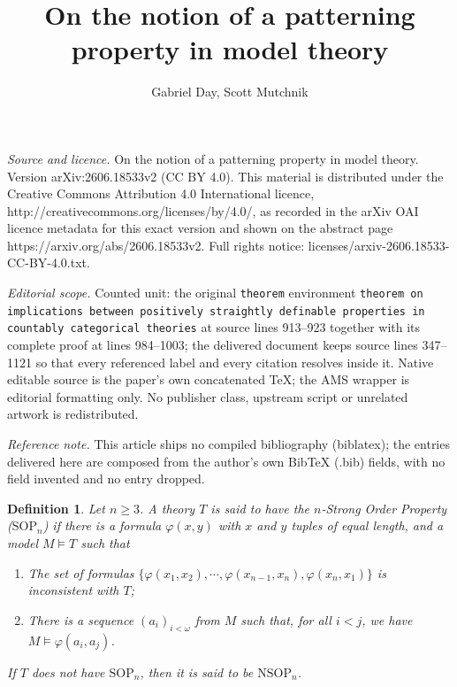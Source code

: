 \documentclass[10pt,a4paper]{amsart}
\newcommand{\NSOP}{\text{NSOP}}
\newcommand{\SOP}{\text{SOP}}
\newcommand{\SOPn}{$\text{SOP}_n$}
\newcommand{\vphi}{\varphi}
\newtheorem{definition}{Definition}
\begin{document}
\title[On the notion of a patterning property in model theory]{On the notion of a patterning property in model theory}
\author{Gabriel Day, Scott Mutchnik}
\date{}
\maketitle
\noindent\emph{Source and licence.} On the notion of a patterning property in model theory. Version arXiv:2606.18533v2 (CC BY 4.0). This material is distributed under the Creative Commons Attribution 4.0 International licence, http://creativecommons.org/licenses/by/4.0/, as recorded in the arXiv OAI licence metadata for this exact version and shown on the abstract page https://arxiv.org/abs/2606.18533v2. Full rights notice: licenses/arxiv-2606.18533-CC-BY-4.0.txt.\par\smallskip
\noindent\textit{Editorial scope.} Counted unit: the original \texttt{theorem} environment \texttt{theorem on implications between positively straightly definable properties in countably categorical theories} at source lines 913--923 together with its complete proof at lines 984--1003; the delivered document keeps source lines 347--1121 so that every referenced label and every citation resolves inside it. Native editable source is the paper's own concatenated TeX; the AMS wrapper is editorial formatting only. No publisher class, upstream script or unrelated artwork is redistributed.
\par\smallskip\noindent\textit{Reference note.} This article ships no compiled bibliography (biblatex); the entries delivered here are composed from the author's own BibTeX (.bib) fields, with no field invented and no entry dropped.
\begin{definition}\label{definition of sopn}
    Let $n\geq 3$.
    A theory $T$ is said to have the $n$\textit{-Strong Order Property} (\SOPn) if there is a formula $\vphi(x,y)$ with $x$ and $y$ tuples of equal length, and a model $M\models T$ such that

    \begin{enumerate}
        \item The set of formulas $\{\vphi(x_1,x_2), \dotsm, \vphi(x_{n-1},x_n),\vphi(x_n,x_1)\}$
        is inconsistent with $T$;

        \item There is a sequence $(a_i)_{i<\omega}$ from $M$ such that, for all $i<j$, we have $M \models \vphi(a_i,a_j)$.
    \end{enumerate}

   If $T$ does not have $\SOP_n$, then it is said to be $\NSOP_n$.
\end{definition}
\end{document}
